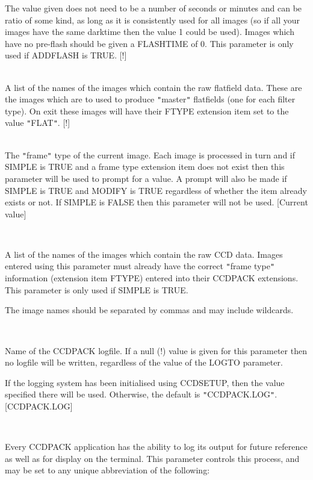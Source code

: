 \documentclass[twoside,11pt]{article}
\newcommand{\htmlref}[2]{#1}
\renewcommand{\_}{\texttt{\symbol{95}}}
\newcommand{\qt}[1]{{\tt "}#1{\tt "}}
\newcommand{\xroutine}[1]{\htmlref{{\sc #1}}{#1}}
\newcommand{\sstsubsection}[1]{ \item[{#1}] \mbox{} \\}
\newcommand{\sstitemlist}[1]{
  \mbox{} \\
  \vspace{-3.5ex}
  \begin{itemize}
     #1
  \end{itemize}
}
\newcommand{\sstsubsection}[1]{\item[{#1}]}
\newcommand{\sstitemlist}[1]{
      \begin{itemize}
         #1
      \end{itemize}
      \\
   }
\begin{document}
{{{         The value given does not need to be a number of seconds or
         minutes and can be ratio of some kind, as long as it is
         consistently used for all images (so if all your images have the
         same darktime then the value 1 could be used). Images which have
         no pre-flash should be given a FLASHTIME of 0. This parameter
         is only used if ADDFLASH is TRUE.
         [!]
      }
      \sstsubsection{
         FLAT = LITERAL (Read)
      } {
         A list of the names of the images which contain the raw
         flatfield data. These are the images which are to used to
         produce \qt{master} flatfields (one for each filter type). On
         exit these images will have their FTYPE extension item set to
         the value \qt{FLAT}.
         [!]
      }
      \sstsubsection{
         FTYPE = LITERAL (Read)
      } {
         The \qt{frame} type of the current image. Each image is processed in
         turn and if SIMPLE is TRUE and a frame type extension item does
         not exist then this parameter will be used to prompt for a
         value. A prompt will also be made if SIMPLE is TRUE and MODIFY
         is TRUE regardless of whether the item already exists or not.
         If SIMPLE is FALSE then this parameter will not be used.
         [Current value]
      }
      \sstsubsection{
         IN = LITERAL (Read)
      } {
         A list of the names of the images which contain the raw CCD
         data. Images entered using this parameter must already have the
         correct \qt{frame type} information (extension item FTYPE)
         entered into their CCDPACK extensions. This parameter is only
         used if SIMPLE is TRUE.

         The image names should be separated by commas and may include
         wildcards.
      }
      \sstsubsection{
         LOGFILE = FILENAME (Read)
      } {
         Name of the CCDPACK logfile.  If a null (!) value is given for
         this parameter then no logfile will be written, regardless of
         the value of the LOGTO parameter.

         If the logging system has been initialised using \xroutine{CCDSETUP},
         then the value specified there will be used. Otherwise, the
         default is \qt{CCDPACK.LOG}.
         [CCDPACK.LOG]
      }
      \sstsubsection{
         LOGTO = LITERAL (Read)
      } {
         Every CCDPACK application has the ability to log its output
         for future reference as well as for display on the terminal.
         This parameter controls this process, and may be set to any
         unique abbreviation of the following:
         \sstitemlist{

}}}}
\end{document}
